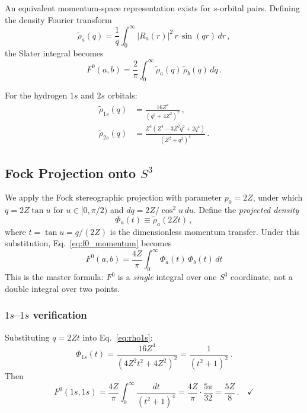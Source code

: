 \documentclass[aps,pra,twocolumn,superscriptaddress,longbibliography]{revtex4-2}
\begin{document}
An equivalent momentum-space representation exists for $s$-orbital pairs.
Defining the density Fourier transform
\begin{equation}
  \tilde{\rho}_a(q)
  = \frac{1}{q} \int_0^\infty |R_a(r)|^2 \, r \, \sin(qr) \, dr \,,
  \label{eq:density_ft}
\end{equation}
the Slater integral becomes
\begin{equation}
  F^0(a,b) = \frac{2}{\pi} \int_0^\infty
  \tilde{\rho}_a(q) \, \tilde{\rho}_b(q) \, dq \,.
  \label{eq:f0_momentum}
\end{equation}

For the hydrogen $1s$ and $2s$ orbitals:
\begin{align}
  \tilde{\rho}_{1s}(q) &= \frac{16Z^4}{(q^2 + 4Z^2)^2} \,,
  \label{eq:rho1s} \\[4pt]
  \tilde{\rho}_{2s}(q) &= \frac{Z^4(Z^4 - 3Z^2 q^2 + 2q^4)}{(Z^2 + q^2)^4} \,.
  \label{eq:rho2s}
\end{align}

\subsection{Fock Projection onto $S^3$}

We apply the Fock stereographic projection with parameter $p_0 = 2Z$,
under which $q = 2Z \tan u$ for $u \in [0, \pi/2)$ and
$dq = 2Z/\cos^2 u \, du$. Define the \emph{projected density}
\begin{equation}
  \Phi_a(t) \equiv \tilde{\rho}_a(2Zt) \,,
  \label{eq:projected_density}
\end{equation}
where $t = \tan u = q/(2Z)$ is the dimensionless momentum transfer.
Under this substitution, Eq.~\eqref{eq:f0_momentum} becomes
\begin{equation}
  \boxed{
    F^0(a,b) = \frac{4Z}{\pi} \int_0^\infty
    \Phi_a(t) \, \Phi_b(t) \, dt
  }
  \label{eq:f0_s3}
\end{equation}
This is the master formula: $F^0$ is a \emph{single} integral over one
$S^3$ coordinate, not a double integral over two points.

\subsubsection{$1s$--$1s$ verification}

Substituting $q = 2Zt$ into Eq.~\eqref{eq:rho1s}:
\begin{equation}
  \Phi_{1s}(t) = \frac{16Z^4}{(4Z^2 t^2 + 4Z^2)^2}
  = \frac{1}{(t^2 + 1)^2} \,.
  \label{eq:phi1s}
\end{equation}
Then
\begin{equation}
  F^0(1s,1s) = \frac{4Z}{\pi} \int_0^\infty
  \frac{dt}{(t^2+1)^4}
  = \frac{4Z}{\pi} \cdot \frac{5\pi}{32}
  = \frac{5Z}{8} \,. \quad\checkmark
\end{equation}
\end{document}
